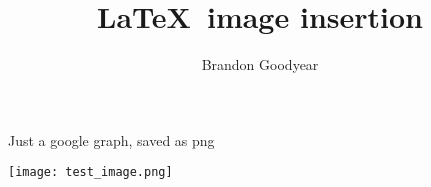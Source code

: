 \documentclass{article}
\begin{document}
\title{\LaTeX \ image insertion}
\author{Brandon Goodyear}
\maketitle
Just a google graph, saved as png
\begin{center}
\texttt{[image: test\_image.png]}%
\end{center}
\end{document}
